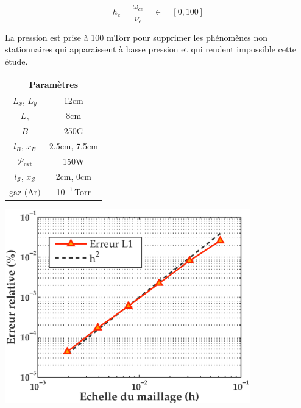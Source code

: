 \begin{refsection}
\begin{equation}
h_e=\frac{\omega_{ce}}{\nu_e}\quad\in\quad \left[0,100\right]
\end{equation}

La pression est prise à 100 mTorr pour supprimer les phénomènes non stationnaires qui apparaissent à basse
pression et qui rendent impossible cette étude. 

\bigskip
\begin{minipage}{\textwidth}
\begin{minipage}[b]{0.32\textwidth}
\footnotesize
\centering
{}
\begin{tabular}{cc}\toprule
\multicolumn{2}{c}{\bf Paramètres}\\
\midrule 
$L_x$, $L_y$ & 12cm\\
$L_z$ & 8cm\\
$B$&250G\\
$l_B$, $x_B$&2.5cm, 7.5cm\\
$\mathcal{P}_\text{ext}$&150W\\
$l_{\mathcal S}$, $x_{\mathcal S}$&2cm, 0cm\\
$\text{gaz (Ar)}$ & 10$^{-1}\,$Torr\\
\bottomrule
\end{tabular}\bigskip\medskip
\label{3-paramConvStudy}
      \end{minipage}
  \hfill
      \begin{minipage}[b]{0.62\textwidth}\centering
    \includegraphics[width=0.8\textwidth]{figures/3-convergence.eps}
    \label{3-convergence}
    \end{minipage}
\end{minipage}
\bigskip


\end{refsection}
